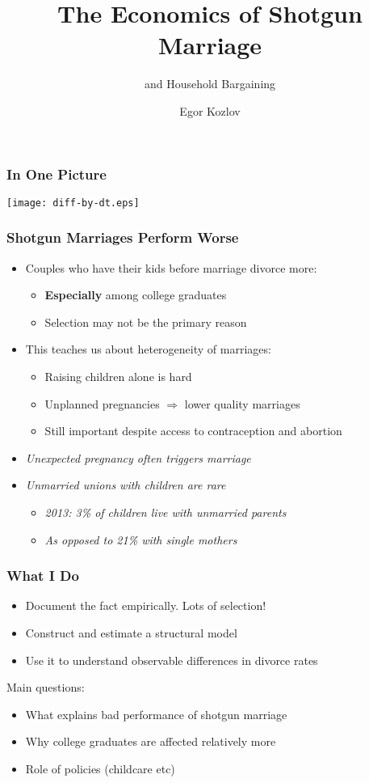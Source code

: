 \documentclass{beamer}
\title{The Economics of Shotgun Marriage}
\subtitle{and Household Bargaining}
\author{Egor Kozlov}
\institute{
  Department of Economics\\
  Northwestern University}
\begin{document}
\begin{frame}[plain]
\addtocounter{framenumber}{-1}
\date{\scriptsize}
\titlepage
\end{frame}


\begin{frame}%
\frametitle{In One Picture}
\begin{center}
\texttt{[image: diff-by-dt.eps]}
\end{center}
\end{frame}

\begin{frame}
\frametitle{Shotgun Marriages Perform Worse}
\begin{itemize}
\item Couples who have their kids before marriage divorce more:
\begin{itemize}
\item \textbf{Especially} among college graduates
\item Selection may not be the primary reason
\end{itemize}
\item This teaches us about heterogeneity of marriages:
\begin{itemize}
\item Raising children alone is hard
\item Unplanned pregnancies $\Rightarrow$ lower quality marriages
\item Still important despite access to contraception and abortion
\end{itemize}
\pause
\item \textit{Unexpected pregnancy often triggers marriage}
\item \textit{Unmarried unions with children are rare}
\begin{itemize}
\item \textit{2013: 3\% of children live with unmarried parents}
\item \textit{As opposed to 21\% with single mothers}
\end{itemize}
\end{itemize}
\end{frame}


\begin{frame}
\frametitle{What I Do}

\begin{itemize}
\item Document the fact empirically. Lots of selection!
\item Construct and estimate a structural model 
\item Use it to understand observable differences in divorce rates
\end{itemize}

Main questions:
\begin{itemize}
\item What explains bad performance of shotgun marriage
\item Why college graduates are affected relatively more
\item Role of policies (childcare etc)
\end{itemize}
\end{frame}
\end{document}
